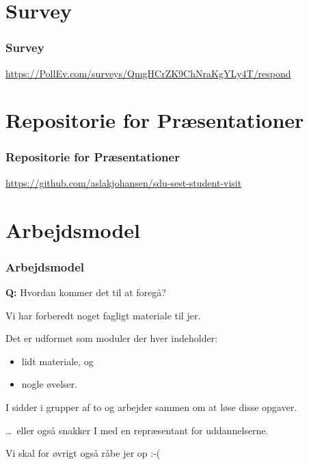 \section{Survey}
\begin{frame}
    \frametitle{Survey}
    \begin{center}
    
      \vspace{4mm}
      \url{https://PollEv.com/surveys/QmgHCrZK9ChNraKgYLy4T/respond}
    \end{center}
\end{frame}


\section{Repositorie for Præsentationer}
\begin{frame}
    \frametitle{Repositorie for Præsentationer}
    \begin{center}
      \url{https://github.com/aslakjohansen/sdu-sest-student-visit}
    \end{center}
\end{frame}

\section{Arbejdsmodel}
\begin{frame}
  \frametitle{Arbejdsmodel}
  \vspace{3mm}
  \textbf{Q:} Hvordan kommer det til at foregå?
  
  \pause
  \vspace{5mm}
  Vi har forberedt noget fagligt materiale til jer.
  
  \vspace{5mm}
  Det er udformet som moduler der hver indeholder:
  \begin{itemize}
    \item lidt materiale, og
    \item nogle øvelser.
  \end{itemize}
  
  \vspace{5mm}
  I sidder i grupper af to og arbejder sammen om at løse disse opgaver.
  
  \pause
  \vspace{5mm}
  \ldots\ eller også snakker I med en repræsentant for uddannelserne.
  
  \pause
  \vspace{5mm}
  Vi skal for øvrigt også råbe jer op :-(
\end{frame}

